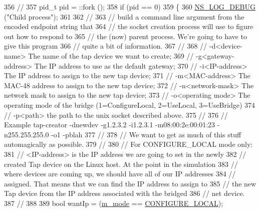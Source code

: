 \begin{DoxyCode}
356   \textcolor{comment}{//}
357   pid\_t pid = ::fork ();
358   \textcolor{keywordflow}{if} (pid == 0)
359     \{
360       \hyperlink{group__logging_ga413f1886406d49f59a6a0a89b77b4d0a}{NS\_LOG\_DEBUG} (\textcolor{stringliteral}{"Child process"});
361 
362       \textcolor{comment}{//}
363       \textcolor{comment}{// build a command line argument from the encoded endpoint string that }
364       \textcolor{comment}{// the socket creation process will use to figure out how to respond to}
365       \textcolor{comment}{// the (now) parent process.  We're going to have to give this program}
366       \textcolor{comment}{// quite a bit of information.}
367       \textcolor{comment}{//}
368       \textcolor{comment}{// -d<device-name> The name of the tap device we want to create;}
369       \textcolor{comment}{// -g<gateway-address> The IP address to use as the default gateway;}
370       \textcolor{comment}{// -i<IP-address> The IP address to assign to the new tap device;}
371       \textcolor{comment}{// -m<MAC-address> The MAC-48 address to assign to the new tap device;}
372       \textcolor{comment}{// -n<network-mask> The network mask to assign to the new tap device;}
373       \textcolor{comment}{// -o<operating mode> The operating mode of the bridge (1=ConfigureLocal, 2=UseLocal, 3=UseBridge)}
374       \textcolor{comment}{// -p<path> the path to the unix socket described above.}
375       \textcolor{comment}{//}
376       \textcolor{comment}{// Example tap-creator -dnewdev -g1.2.3.2 -i1.2.3.1 -m08:00:2e:00:01:23 -n255.255.255.0 -o1 -pblah}
377       \textcolor{comment}{//}
378       \textcolor{comment}{// We want to get as much of this stuff automagically as possible.}
379       \textcolor{comment}{//}
380       \textcolor{comment}{// For CONFIGURE\_LOCAL mode only:}
381       \textcolor{comment}{// <IP-address> is the IP address we are going to set in the newly }
382       \textcolor{comment}{// created Tap device on the Linux host.  At the point in the simulation}
383       \textcolor{comment}{// where devices are coming up, we should have all of our IP addresses}
384       \textcolor{comment}{// assigned.  That means that we can find the IP address to assign to }
385       \textcolor{comment}{// the new Tap device from the IP address associated with the bridged}
386       \textcolor{comment}{// net device.}
387       \textcolor{comment}{//}
388 
389       \textcolor{keywordtype}{bool} wantIp = (\hyperlink{classns3_1_1TapBridge_aaae30bc9d5dd36e3a4d569cf9bcf40eb}{m\_mode} == \hyperlink{classns3_1_1TapBridge_acac8d3ebe259ddfa9cd369515f04618daf2d0f6c8152d38e9400b2d9fd35f02a3}{CONFIGURE\_LOCAL});

\end{DoxyCode}
